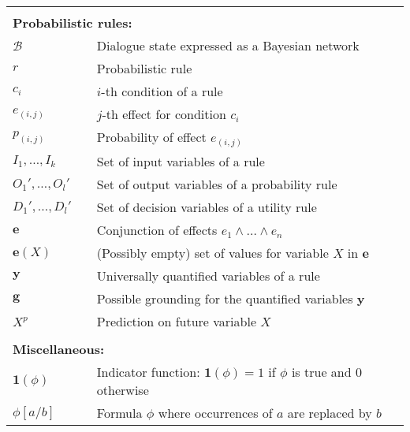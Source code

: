 \begin{longtable}{lp{5mm}p{95mm}}
&&  \vspace{3mm} \\
\multicolumn{3}{l}{\textbf{Probabilistic rules:}} \vspace{2mm} \\
$\mathcal{B}$ && Dialogue state expressed as a Bayesian network \\
$r$ && Probabilistic rule \\
$c_i$ && $i$-th condition of a rule \\
$e_{(i,j)}$ && $j$-th effect for condition $c_i$ \\
$p_{(i,j)}$ && Probability of effect $e_{(i,j)}$ \\
$I_1, \dots, I_{k}$  && Set of input variables of a rule\\
$O_1', \dots, O_{l}'$ && Set of output variables of a probability rule \\
$D_1', \dots, D_{l}'$ && Set of decision variables of a utility rule \\
$\mathbf{e}$ && Conjunction of effects $e_1 \land \dots \land e_n$ \\
$\mathbf{e}(X)$ && (Possibly empty) set of values for variable $X$ in $\mathbf{e}$ \\
$\mathbf{y}$ && Universally quantified variables of a rule  \\
$\mathbf{g}$ && Possible grounding for the quantified variables $\mathbf{y}$ \\
$X^p$ && Prediction on future variable $X$ \\
&&  \vspace{3mm} \\
\multicolumn{3}{l}{\textbf{Miscellaneous:}} \vspace{2mm} \\
$\mathbf{1}(\phi)$ && Indicator function: $\mathbf{1}(\phi)\!=\!1$ if $\phi$ is true and 0 otherwise \\
$\phi[a / b]$ && Formula $\phi$ where occurrences of $a$ are replaced by $b$ \\
\end{longtable}
